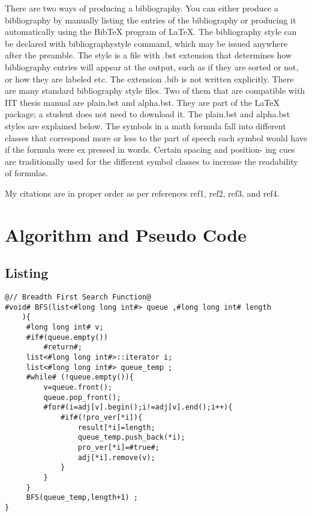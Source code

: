 \documentclass[12pt,a4paper]{article}
\begin{document}
{\newpage
There are two ways of producing a bibliography\cite{latex_hopka}. You can either produce
a bibliography by manually listing the entries of the bibliography or producing
it automatically using the BibTeX program of LaTeX. The bibliography style can
be declared with bibliographystyle command, which may be issued anywhere
after the preamble. The style is a file with .bst extension that determines how
bibliography entries will appear at the output, such as if they are sorted or not,
or how they are labeled etc. The extension .bib is not written explicitly. There
are many standard bibliography style files. Two of them that are compatible
with IIT thesis manual are plain.bst and alpha.bst. They are part of the LaTeX
package; a student does not need to download it. The plain.bst and alpha.bst
styles are explained below. The symbols in a math formula fall into different
classes that correspond more or less to the part of speech each symbol would
have if the formula were ex pressed in words. Certain spacing and position-
ing cues are traditionally used for the different symbol classes to increase the
readability of formulas. \cite{latex_michael}

My citations are in proper order as per references ref1, ref2, ref3, and ref4.

\newpage
\section{Algorithm and Pseudo Code}
\subsection{Listing}

\hrulefill
\large{
\begin{lstlisting}[style=color]
@// Breadth First Search Function@
#void# BFS(list<#long long int#> queue ,#long long int# length
    ){
     #long long int# v;
     #if#(queue.empty())
         #return#;
     list<#long long int#>::iterator i;
     list<#long long int#> queue_temp ;
     #while# (!queue.empty()){
         v=queue.front();
         queue.pop_front();
         #for#(i=adj[v].begin();i!=adj[v].end();i++){
             #if#(!pro_ver[*i]){
                 result[*i]=length;
                 queue_temp.push_back(*i);
                 pro_ver[*i]=#true#;
                 adj[*i].remove(v);
             }
         }
     }
     BFS(queue_temp,length+1) ;
}
\end{lstlisting}}
\hrulefill
\newpage

}
\end{document}
